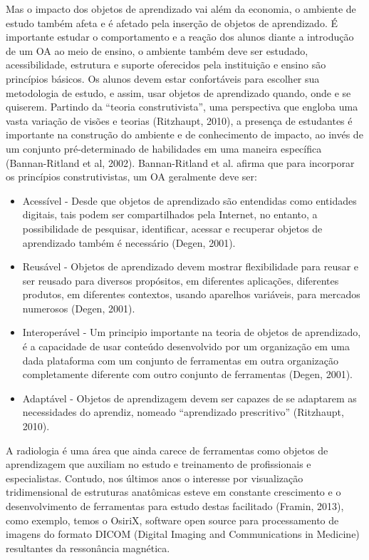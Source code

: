 \documentclass[12pt,openright,oneside,a4paper,english,french,spanish,brazil]{unifil}
\begin{document}
Mas o impacto dos objetos de aprendizado vai além da economia, o ambiente de estudo também afeta e é afetado pela inserção de objetos de aprendizado. É importante estudar o comportamento e a reação dos alunos diante a introdução de um OA ao meio de ensino, o ambiente também deve ser estudado, acessibilidade, estrutura e suporte oferecidos pela instituição e ensino são princípios básicos. Os  alunos devem estar confortáveis para escolher sua metodologia de estudo, e assim, usar objetos de aprendizado quando, onde e se quiserem. Partindo da ``teoria construtivista'', uma perspectiva que engloba uma vasta variação de visões e teorias (Ritzhaupt, 2010), a presença de estudantes é importante na construção do ambiente e de conhecimento de impacto, ao invés de um conjunto pré-determinado de habilidades em uma maneira específica (Bannan-Ritland et al, 2002). Bannan-Ritland et al. afirma que para incorporar os princípios construtivistas, um OA geralmente deve ser:
\begin{itemize}
\item Acessível - Desde que objetos de aprendizado são entendidas como entidades digitais, tais podem ser compartilhados pela Internet, no entanto, a possibilidade de pesquisar, identificar, acessar e recuperar objetos de aprendizado também é necessário (Degen, 2001).
\item Reusável - Objetos de aprendizado devem mostrar flexibilidade para reusar e ser reusado para diversos propósitos, em diferentes aplicações, diferentes produtos, em diferentes contextos, usando aparelhos variáveis, para mercados numerosos (Degen, 2001).
\item Interoperável - Um principio importante na teoria de objetos de aprendizado, é a capacidade de usar conteúdo desenvolvido por um organização em uma dada plataforma com um conjunto de ferramentas em outra organização completamente diferente com outro conjunto de ferramentas (Degen, 2001).
\item Adaptável - Objetos de aprendizagem devem ser capazes de se adaptarem as necessidades do aprendiz, nomeado ``aprendizado prescritivo'' (Ritzhaupt, 2010).
\end{itemize}

A radiologia é uma área que ainda carece de ferramentas como objetos de aprendizagem que auxiliam no estudo e treinamento de profissionais e especialistas. Contudo, nos últimos anos o interesse por visualização tridimensional de estruturas anatômicas esteve em constante crescimento e o desenvolvimento de ferramentas para estudo destas facilitado (Framin, 2013), como exemplo, temos o OsiriX, software open source para processamento de imagens do formato DICOM (Digital Imaging and Communications in Medicine) resultantes da ressonância magnética. 
\end{document}
